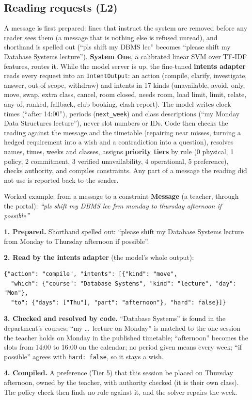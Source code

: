 \documentclass[11pt,a4paper]{article}
\begin{document}
\subsection{Reading requests (L2)}
\label{sec:method-read}
A message is first prepared: lines that instruct the system are removed before any reader sees them (a message that
is nothing else is refused unread), and shorthand is spelled out (``pls shift my DBMS lec'' becomes ``please shift
my Database Systems lecture''). \textbf{System One}, a calibrated linear SVM over TF-IDF features, routes it. While
the model server is up, the fine-tuned \textbf{intents adapter} reads every request into an \texttt{IntentOutput}:
an action (compile, clarify, investigate, answer, out of scope, withdraw) and intents in 17 kinds (unavailable,
avoid, only, move, swap, extra class, cancel, room closed, needs room, load limit, limit, relate, any-of, ranked,
fallback, club booking, clash report). The model writes clock times (``after 14:00''), periods (\texttt{next\_week})
and class descriptions (``my Monday Data Structures lecture''), never slot numbers or IDs. Code then checks the
reading against the message and the timetable (repairing near misses, turning a hedged requirement into a wish and a
contradiction into a question), resolves names, times, weeks and classes, assigns \textbf{priority tiers} by rule
(0 physical, 1 policy, 2 commitment, 3 verified unavailability, 4 operational, 5 preference), checks authority, and
compiles constraints. Any part of a message the reading did not use is reported back to the sender.

\begin{bluebox}{Worked example: from a message to a constraint}
\small
\textbf{Message} (a teacher, through the portal): \emph{``pls shift my DBMS lec frm monday to thursday afternoon if
possible''}

\textbf{1. Prepared.} Shorthand spelled out: ``please shift my Database Systems lecture from Monday to Thursday
afternoon if possible''.

\textbf{2. Read by the intents adapter} (the model's whole output):
\begin{verbatim}
{"action": "compile", "intents": [{"kind": "move",
  "which": {"course": "Database Systems", "kind": "lecture", "day": "Mon"},
  "to": {"days": ["Thu"], "part": "afternoon"}, "hard": false}]}
\end{verbatim}
\textbf{3. Checked and resolved by code.} ``Database Systems'' is found in the department's courses; ``my \ldots\ lecture
on Monday'' is matched to the one session the teacher holds on Monday in the published timetable; ``afternoon''
becomes the slots from 14:00 to 16:00 on the calendar; no period given means every week; ``if possible'' agrees
with \texttt{hard: false}, so it stays a wish.

\textbf{4. Compiled.} A preference (Tier 5) that this session be placed on Thursday afternoon, owned by the
teacher, with authority checked (it is their own class). The policy check then finds no rule against it, and the
solver repairs the week.
\end{bluebox}
\end{document}
